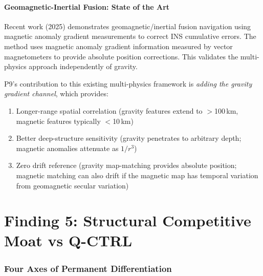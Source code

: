 \documentclass[11pt]{article}
\theoremstyle{definition}
\theoremstyle{remark}
\begin{document}
\subsection{Geomagnetic-Inertial Fusion: State of the Art}

Recent work (2025) demonstrates geomagnetic/inertial fusion navigation
using magnetic anomaly gradient measurements to correct INS cumulative
errors. The method uses magnetic anomaly gradient information measured
by vector magnetometers to provide absolute position corrections.
This validates the multi-physics approach independently of gravity.

P9's contribution to this existing multi-physics framework is
\emph{adding the gravity gradient channel}, which provides:
\begin{enumerate}[nosep]
\item Longer-range spatial correlation (gravity features extend to
  $>$100\,km, magnetic features typically $<$10\,km)
\item Better deep-structure sensitivity (gravity penetrates to
  arbitrary depth; magnetic anomalies attenuate as $1/r^3$)
\item Zero drift reference (gravity map-matching provides absolute
  position; magnetic matching can also drift if the magnetic map
  has temporal variation from geomagnetic secular variation)
\end{enumerate}

\part{Finding 5: Structural Competitive Moat vs Q-CTRL}
\label{part:competitive}

\section{Four Axes of Permanent Differentiation}
\label{sec:four-axes}
\end{document}

